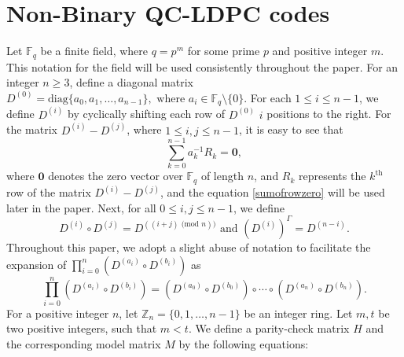 \documentclass[conference]{IEEEtran}
\begin{document}
\section{Non-Binary QC-LDPC codes}\label{Sec.2}
Let \(\mathbb{F}_{q}\) be a finite field, where \(q = p^{m}\) for some prime \(p\) and positive integer \(m\). This notation for the field will be used consistently throughout the paper. For an integer $n\geq3$,  define a diagonal matrix $D^{(0)}=\text{diag}\{a_{0},a_{1},\ldots,a_{n-1}\}, \text{ where } a_{i}\in\mathbb{F}_{q}\setminus\{0\}.$
For each $1 \leq i \leq n - 1$, we define $D^{(i)}$ by cyclically shifting each row of $D^{(0)}$ $i$ positions to the right. For the matrix $D^{(i)} - D^{(j)}$, where $1 \leq i, j \leq n - 1$, it is easy to see that
\begin{equation}\label{sumofrowzero}
  \sum_{k=0}^{n-1} a_k^{-1} R_k = \mathbf{0},
\end{equation}
where \(\mathbf{0}\) denotes the zero vector over \(\mathbb{F}_{q}\) of length $n$, and $R_k$ represents the \(k^{\text{th}}\) row of the matrix \(D^{(i)} - D^{(j)}\), and the equation \eqref{sumofrowzero} will be used later in the paper.
 Next, for all $0\leq i,j\leq n-1$, we define \begin{equation}\label{matrix_product}
      D^{(i)}\circ D^{(j)}=D^{((i+j) \text{ (mod $n$}))} \text{ and }
    (D^{(i)})^{\Gamma}=D^{(n-i)}.
 \end{equation}
Throughout this paper, we adopt a slight abuse of notation to facilitate the expansion of $\prod\limits_{i=0}^{n} (D^{(a_{i})}\circ D^{(b_{i})})$ as\\
\begin{equation*}
    \prod\limits_{i=0}^{n} (D^{(a_{i})}\circ D^{(b_{i})})=(D^{(a_{0})}\circ D^{(b_{0})})\circ \cdots\circ (D^{(a_{n})}\circ D^{(b_{n})}).
\end{equation*}
For a positive integer $n$, let $\mathbb{Z}_{n}=\{0,1,\ldots,n-1\}$ be an integer ring. Let $m, t$ be two positive integers, such that $m<t$. We define a parity-check matrix $H$ and the corresponding model matrix $M$ by the following equations:
\end{document}
